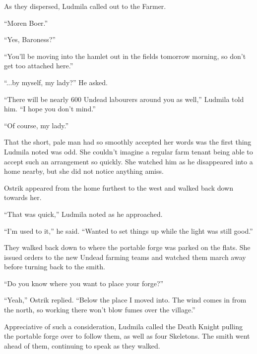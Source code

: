  

As they dispersed, Ludmila called out to the Farmer.

 

“Moren Boer.”

 

“Yes, Baroness?”

 

“You’ll be moving into the hamlet out in the fields tomorrow morning, so don’t get too attached here.”

 

“...by myself, my lady?” He asked.

 

“There will be nearly 600 Undead labourers around you as well,” Ludmila told him. “I hope you don’t mind.”

 

“Of course, my lady.”

 

That the short, pale man had so smoothly accepted her words was the first thing Ludmila noted was odd. She couldn’t imagine a regular farm tenant being able to accept such an arrangement so quickly. She watched him as he disappeared into a home nearby, but she did not notice anything amiss.

 

Ostrik appeared from the home furthest to the west and walked back down towards her.

 

“That was quick,” Ludmila noted as he approached.

 

“I’m used to it,” he said. “Wanted to set things up while the light was still good.”

 

They walked back down to where the portable forge was parked on the flats. She issued orders to the new Undead farming teams and watched them march away before turning back to the smith.

 

“Do you know where you want to place your forge?”

 

“Yeah,” Ostrik replied. “Below the place I moved into. The wind comes in from the north, so working there won’t blow fumes over the village.”

 

Appreciative of such a consideration, Ludmila called the Death Knight pulling the portable forge over to follow them, as well as four Skeletons. The smith went ahead of them, continuing to speak as they walked.

